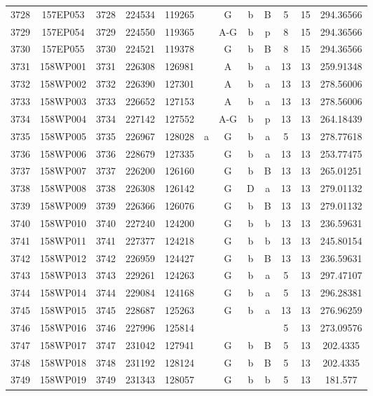 \begin{tabular}{|*{12}{c|}}
3728 & 157EP053 & 3728 & 224534 & 119265 &  & G & b & B & 5 & 15 & 294.36566 \\ 
3729 & 157EP054 & 3729 & 224550 & 119365 &  & A-G & b & p & 8 & 15 & 294.36566 \\ 
3730 & 157EP055 & 3730 & 224521 & 119378 &  & G & b & B & 8 & 15 & 294.36566 \\ 
3731 & 158WP001 & 3731 & 226308 & 126981 &  & A & b & a & 13 & 13 & 259.91348 \\ 
3732 & 158WP002 & 3732 & 226390 & 127301 &  & A & b & a & 13 & 13 & 278.56006 \\ 
3733 & 158WP003 & 3733 & 226652 & 127153 &  & A & b & a & 13 & 13 & 278.56006 \\ 
3734 & 158WP004 & 3734 & 227142 & 127552 &  & A-G & b & p & 13 & 13 & 264.18439 \\ 
3735 & 158WP005 & 3735 & 226967 & 128028 & a & G & b & a & 5 & 13 & 278.77618 \\ 
3736 & 158WP006 & 3736 & 228679 & 127335 &  & G & b & a & 13 & 13 & 253.77475 \\ 
3737 & 158WP007 & 3737 & 226200 & 126160 &  & G & b & B & 13 & 13 & 265.01251 \\ 
3738 & 158WP008 & 3738 & 226308 & 126142 &  & G & D & a & 13 & 13 & 279.01132 \\ 
3739 & 158WP009 & 3739 & 226366 & 126076 &  & G & b & B & 13 & 13 & 279.01132 \\ 
3740 & 158WP010 & 3740 & 227240 & 124200 &  & G & b & b & 13 & 13 & 236.59631 \\ 
3741 & 158WP011 & 3741 & 227377 & 124218 &  & G & b & b & 13 & 13 & 245.80154 \\ 
3742 & 158WP012 & 3742 & 226959 & 124427 &  & G & b & B & 13 & 13 & 236.59631 \\ 
3743 & 158WP013 & 3743 & 229261 & 124263 &  & G & b & a & 5 & 13 & 297.47107 \\ 
3744 & 158WP014 & 3744 & 229084 & 124168 &  & G & b & a & 5 & 13 & 296.28381 \\ 
3745 & 158WP015 & 3745 & 228687 & 125263 &  & G & b & a & 13 & 13 & 276.96259 \\ 
3746 & 158WP016 & 3746 & 227996 & 125814 &  &  &  &  & 5 & 13 & 273.09576 \\ 
3747 & 158WP017 & 3747 & 231042 & 127941 &  & G & b & B & 5 & 13 & 202.4335 \\ 
3748 & 158WP018 & 3748 & 231192 & 128124 &  & G & b & B & 5 & 13 & 202.4335 \\ 
3749 & 158WP019 & 3749 & 231343 & 128057 &  & G & b & b & 5 & 13 & 181.577 \\ 

\end{tabular}

